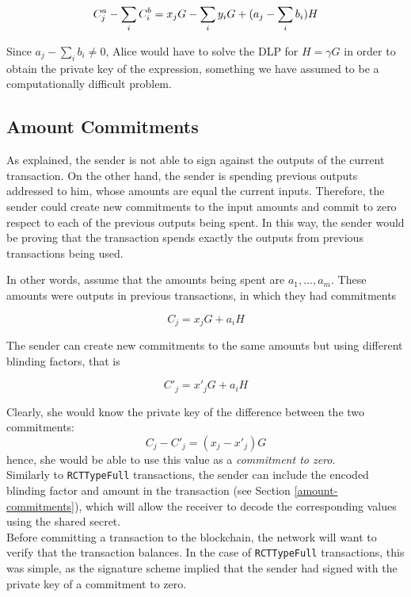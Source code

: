 \[  C^a_{j} - \sum\limits_i C^b_{i} \\
= x_j G -  \sum_i y_i G + (a_j - \sum\limits_i  b_i) H \]

Since \(a_j - \sum\limits_i  b_i \ne 0\), Alice would have to solve the DLP for \(H = \gamma G\) in order to obtain the private key of
the expression, something we have assumed to be a computationally difficult problem. 


\subsection{Amount Commitments}
\label{RCTTypeSimple-commitments}

As explained, the sender is not able to sign against the outputs of the current transaction.
On the other hand, the sender is spending previous outputs addressed to him, whose amounts
are equal the current inputs. 
Therefore, the sender could create new commitments to the input amounts and commit
to zero respect to each of the previous outputs being spent.
In this way, the sender would be proving that the transaction spends exactly the outputs
from previous transactions being used.

In other words, assume that the amounts being spent are \(a_1, ..., a_m\). 
These amounts were outputs in previous transactions, in which they had commitments 

\[C_{j} = x_j G + a_i H\]


The sender can create new commitments to the same amounts but using different blinding factors, that is

\[C'_{j} = x'_j G + a_i H\]

Clearly, she would know the private key of the difference between the two commitments: 
\[ C_{j} - C'_{j} = (x_j - x'_j) G \] 
hence, she would be able to use this value as a {\em commitment to zero}.
\\

Similarly to {\tt RCTTypeFull} transactions, the sender can include the encoded blinding factor and amount in
the transaction (see Section \ref{amount-commitments}), which will allow the receiver to decode the corresponding
values using the shared secret.
\\

Before committing a transaction to the blockchain, the network will want to verify that the transaction balances.
In the case of {\tt RCTTypeFull} transactions, this was simple, as the signature scheme implied that 
the sender had signed with the private key of a commitment to zero.
\\

